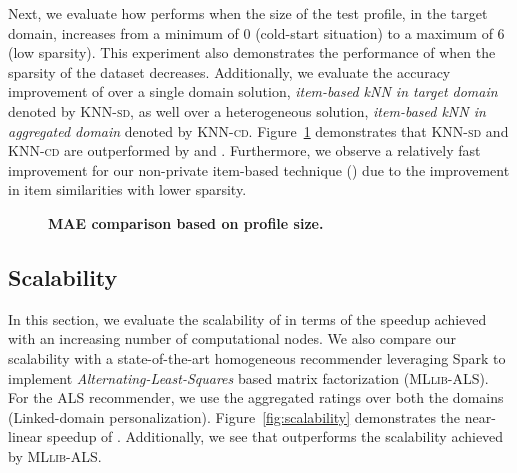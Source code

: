 Next, we evaluate how \crossrec performs when the size of the test profile, in the target domain, increases from a minimum of 0 (cold-start situation) to a maximum of 6 (low sparsity). This experiment also demonstrates the performance of \crossrec when the sparsity of the dataset decreases. Additionally, we evaluate the accuracy improvement of \crossrec over a single domain solution, \emph{item-based kNN in target domain} denoted by \textsc{KNN-sd}, as well over a heterogeneous solution, \emph{item-based kNN in aggregated domain} denoted by \textsc{KNN-cd}. Figure~\ref{fig:varyProfile} demonstrates that \textsc{KNN-sd} and \textsc{KNN-cd} are outperformed by \npcrossrec and \crossrec. Furthermore, we observe a relatively fast improvement for our non-private item-based technique (\npcrossrecib) due to the improvement in item similarities with lower sparsity.
\begin{figure}[ht]
\vspace{-4mm}
\hspace{-1em}
\vspace{-6mm}
\caption{\bf MAE comparison based on profile size.}
\vspace{2mm}
\label{fig:varyProfile}
\end{figure}



\subsection{Scalability}
In this section, we evaluate the scalability of \crossrec in terms of the speedup achieved with an increasing number of computational nodes. We also compare our scalability with a state-of-the-art homogeneous recommender leveraging Spark to implement \emph{Alternating-Least-Squares} based matrix factorization (\textsc{MLlib-ALS}). For the ALS recommender, we use the aggregated ratings over both the domains (Linked-domain personalization). Figure~\ref{fig:scalability} demonstrates the near-linear speedup of \crossrec. Additionally, we see that \crossrec outperforms the scalability achieved by \textsc{MLlib-ALS}.

